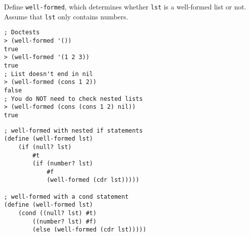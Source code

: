 \begin{blocksection}
\question Define \lstinline$well-formed$, which determines whether \lstinline$lst$ is a well-formed list or not. Assume that \lstinline$lst$ only contains numbers.

\begin{lstlisting}
; Doctests
> (well-formed '())
true
> (well-formed '(1 2 3))
true
; List doesn't end in nil
> (well-formed (cons 1 2))
false
; You do NOT need to check nested lists
> (well-formed (cons (cons 1 2) nil))
true
\end{lstlisting}

\begin{solution}[1.5in]
\begin{lstlisting}
; well-formed with nested if statements
(define (well-formed lst)
    (if (null? lst)
        #t
        (if (number? lst)
            #f
            (well-formed (cdr lst)))))

; well-formed with a cond statement
(define (well-formed lst)
    (cond ((null? lst) #t)
        ((number? lst) #f)
        (else (well-formed (cdr lst)))))
\end{lstlisting}
\end{solution}
\end{blocksection}
